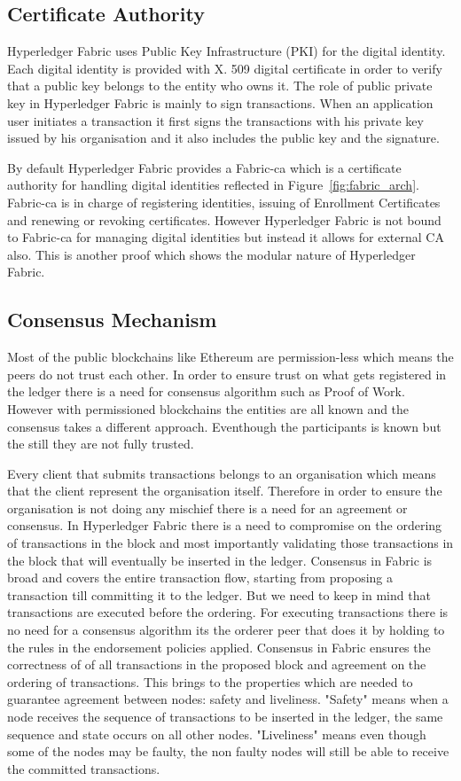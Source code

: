 \subsection{Certificate Authority}

Hyperledger Fabric uses Public Key Infrastructure (PKI) for the digital identity. Each digital identity is provided with X. 509 digital certificate in order to verify that a public key belongs to the entity who owns it. The role of public private key in Hyperledger Fabric is mainly to sign transactions. When an application user initiates a transaction it first signs the transactions with his private key issued by his organisation and it also includes the public key and the signature. 

By default Hyperledger Fabric provides a Fabric-ca which is a certificate authority for handling digital identities reflected in Figure~\ref{fig:fabric_arch}. Fabric-ca is in charge of registering identities, issuing of Enrollment Certificates and renewing or revoking certificates. However Hyperledger Fabric is not bound to Fabric-ca for managing digital identities but instead it allows for external CA also. This is another proof which shows the modular nature of Hyperledger Fabric. 

\subsection{Consensus Mechanism}
Most of the public blockchains like Ethereum are permission-less which means the peers do not trust each other. In order to ensure trust on what gets registered in the ledger there is a need for consensus algorithm such as Proof of Work. However with permissioned blockchains the entities are all known and the consensus takes a different approach.  Eventhough the participants is known but the still they are not fully trusted. 

Every client that submits transactions belongs to an organisation which means that the client represent the organisation itself. Therefore in order to ensure the organisation is not doing any mischief there is a need for an agreement or consensus.   
In Hyperledger Fabric there is a need to compromise on the ordering of transactions in the block and most importantly validating those transactions in the block that will eventually be inserted in the ledger. Consensus in Fabric is broad and covers the entire transaction flow, starting from proposing a transaction till committing it to the ledger. But we need to keep in mind that transactions are executed before the ordering. For executing transactions there is no need for a consensus algorithm its the orderer peer that does it by holding to the rules in the endorsement policies applied. Consensus in Fabric ensures the correctness of of all transactions in the proposed block and agreement on the ordering of transactions. This brings to the properties which are needed to guarantee agreement between nodes: safety and liveliness. "Safety" means when a node receives the sequence of transactions to be inserted in the ledger, the same sequence and state occurs on all other nodes. "Liveliness" means even though some of the nodes may be faulty, the non faulty nodes will still be able to receive the committed transactions. 

